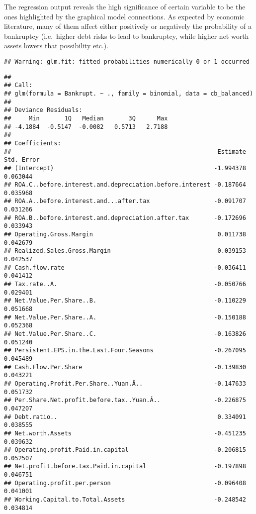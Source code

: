 \documentclass[
]{article}
\begin{document}
The regression output reveals the high significance of certain variable
to be the ones highlighted by the graphical model connections. As
expected by economic literature, many of them affect either positively
or negatively the probability of a bankruptcy (i.e.~higher debt risks to
lead to bankruptcy, while higher net worth assets lowers that
possibility etc.).

\begin{verbatim}
## Warning: glm.fit: fitted probabilities numerically 0 or 1 occurred
\end{verbatim}

\begin{verbatim}
## 
## Call:
## glm(formula = Bankrupt. ~ ., family = binomial, data = cb_balanced)
## 
## Deviance Residuals: 
##     Min       1Q   Median       3Q      Max  
## -4.1884  -0.5147  -0.0082   0.5713   2.7188  
## 
## Coefficients:
##                                                          Estimate Std. Error
## (Intercept)                                             -1.994378   0.063044
## ROA.C..before.interest.and.depreciation.before.interest -0.187664   0.035968
## ROA.A..before.interest.and...after.tax                  -0.091707   0.031266
## ROA.B..before.interest.and.depreciation.after.tax       -0.172696   0.033943
## Operating.Gross.Margin                                   0.011738   0.042679
## Realized.Sales.Gross.Margin                              0.039153   0.042537
## Cash.flow.rate                                          -0.036411   0.041412
## Tax.rate..A.                                            -0.050766   0.029401
## Net.Value.Per.Share..B.                                 -0.110229   0.051668
## Net.Value.Per.Share..A.                                 -0.150188   0.052368
## Net.Value.Per.Share..C.                                 -0.163826   0.051240
## Persistent.EPS.in.the.Last.Four.Seasons                 -0.267095   0.045489
## Cash.Flow.Per.Share                                     -0.139830   0.043221
## Operating.Profit.Per.Share..Yuan.Â..                    -0.147633   0.051732
## Per.Share.Net.profit.before.tax..Yuan.Â..               -0.226875   0.047207
## Debt.ratio..                                             0.334091   0.038555
## Net.worth.Assets                                        -0.451235   0.039632
## Operating.profit.Paid.in.capital                        -0.206815   0.052507
## Net.profit.before.tax.Paid.in.capital                   -0.197898   0.046751
## Operating.profit.per.person                             -0.096408   0.041001
## Working.Capital.to.Total.Assets                         -0.248542   0.034814

\end{verbatim}
\end{document}
